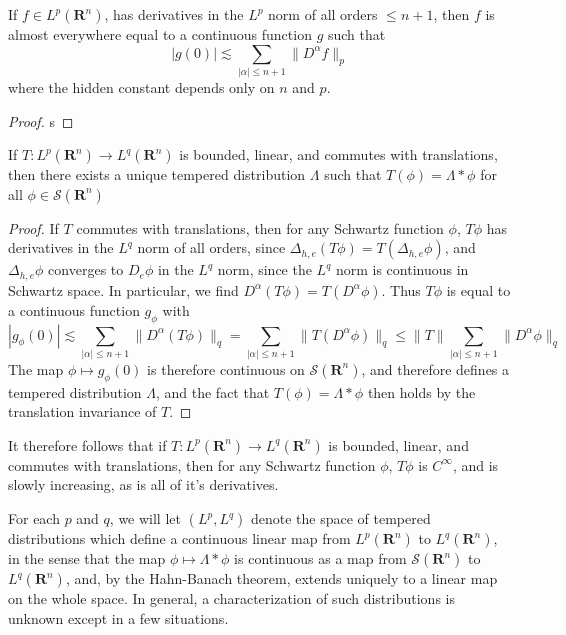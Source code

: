 \begin{lemma}
	If $f \in L^p(\mathbf{R}^n)$, has derivatives in the $L^p$ norm of all orders $\leq n+1$, then $f$ is almost everywhere equal to a continuous function $g$ such that
	\[ |g(0)| \lesssim \sum_{|\alpha| \leq n + 1} \| D^\alpha f \|_p \]
	where the hidden constant depends only on $n$ and $p$.
\end{lemma}
\begin{proof}
	s
\end{proof}

\begin{theorem}
	If $T: L^p(\mathbf{R}^n) \to L^q(\mathbf{R}^n)$ is bounded, linear, and commutes with translations, then there exists a unique tempered distribution $\Lambda$ such that $T(\phi) = \Lambda * \phi$ for all $\phi \in \mathcal{S}(\mathbf{R}^n)$
\end{theorem}
\begin{proof}
	If $T$ commutes with translations, then for any Schwartz function $\phi$, $T\phi$ has derivatives in the $L^q$ norm of all orders, since $\Delta_{h,e}(T \phi) = T(\Delta_{h,e} \phi)$, and $\Delta_{h,e} \phi$ converges to $D_e \phi$ in the $L^q$ norm, since the $L^q$ norm is continuous in Schwartz space. In particular, we find $D^\alpha (T\phi) = T(D^\alpha \phi)$. Thus $T\phi$ is equal to a continuous function $g_\phi$ with
	\[ |g_\phi(0)| \lesssim \sum_{|\alpha| \leq n+1} \| D^\alpha(T\phi) \|_q = \sum_{|\alpha| \leq n+1} \| T(D^\alpha \phi) \|_q \leq \| T \| \sum_{|\alpha| \leq n+1} \| D^\alpha \phi \|_q \]
	The map $\phi \mapsto g_\phi(0)$ is therefore continuous on $\mathcal{S}(\mathbf{R}^n)$, and therefore defines a tempered distribution $\Lambda$, and the fact that $T(\phi) = \Lambda * \phi$ then holds by the translation invariance of $T$.
\end{proof}

\begin{remark}
	It therefore follows that if $T: L^p(\mathbf{R}^n) \to L^q(\mathbf{R}^n)$ is bounded, linear, and commutes with translations, then for any Schwartz function $\phi$, $T\phi$ is $C^\infty$, and is slowly increasing, as is all of it's derivatives.
\end{remark}

For each $p$ and $q$, we will let $(L^p,L^q)$ denote the space of tempered distributions which define a continuous linear map from $L^p(\mathbf{R}^n)$ to $L^q(\mathbf{R}^n)$, in the sense that the map $\phi \mapsto \Lambda * \phi$ is continuous as a map from $\mathcal{S}(\mathbf{R}^n)$ to $L^q(\mathbf{R}^n)$, and, by the Hahn-Banach theorem, extends uniquely to a linear map on the whole space. In general, a characterization of such distributions is unknown except in a few situations.

